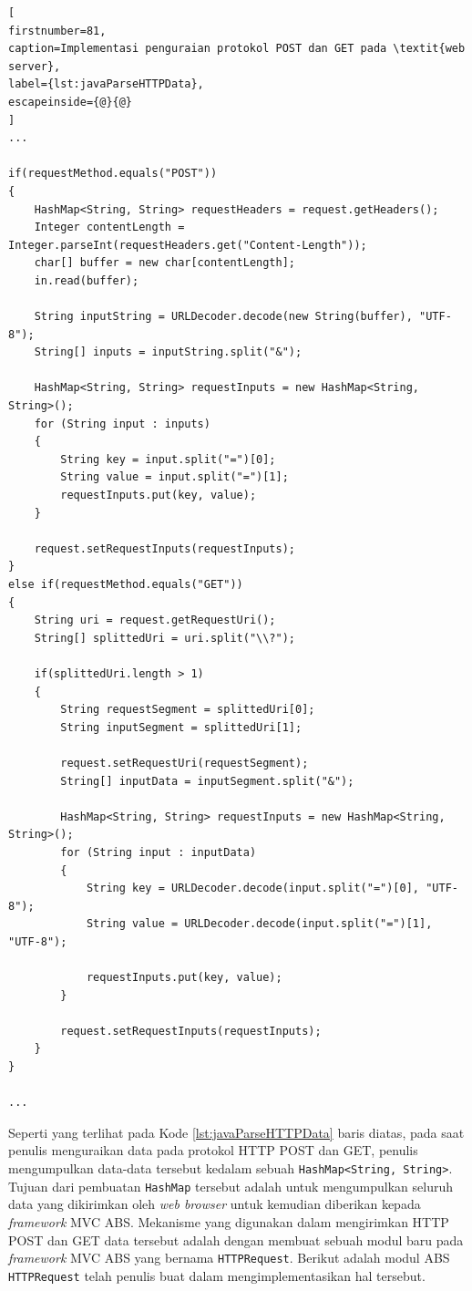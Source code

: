 \begin{lstlisting}[
firstnumber=81,
caption=Implementasi penguraian protokol POST dan GET pada \textit{web server},
label={lst:javaParseHTTPData},
escapeinside={@}{@}
]
...

if(requestMethod.equals("POST"))
{
   	HashMap<String, String> requestHeaders = request.getHeaders();
   	Integer contentLength = Integer.parseInt(requestHeaders.get("Content-Length"));
   	char[] buffer = new char[contentLength];
   	in.read(buffer);
   	
   	String inputString = URLDecoder.decode(new String(buffer), "UTF-8");
   	String[] inputs = inputString.split("&");
   	
   	HashMap<String, String> requestInputs = new HashMap<String, String>();
   	for (String input : inputs) 
   	{
		String key = input.split("=")[0];
		String value = input.split("=")[1];
		requestInputs.put(key, value);
	}
            	
    request.setRequestInputs(requestInputs);
}
else if(requestMethod.equals("GET"))
{
   	String uri = request.getRequestUri();
   	String[] splittedUri = uri.split("\\?");
   	
   	if(splittedUri.length > 1)
   	{
   		String requestSegment = splittedUri[0];
   		String inputSegment = splittedUri[1];
   		
   		request.setRequestUri(requestSegment);
   		String[] inputData = inputSegment.split("&");

   		HashMap<String, String> requestInputs = new HashMap<String, String>();
   		for (String input : inputData) 
   		{
   			String key = URLDecoder.decode(input.split("=")[0], "UTF-8");
   			String value = URLDecoder.decode(input.split("=")[1], "UTF-8");
   			
   			requestInputs.put(key, value);
		}
            		
   		request.setRequestInputs(requestInputs);
   	}
}

...
\end{lstlisting}

Seperti yang terlihat pada Kode \ref{lst:javaParseHTTPData} baris diatas, pada saat penulis menguraikan data pada protokol HTTP POST dan GET, penulis mengumpulkan data-data tersebut kedalam sebuah \texttt{HashMap<String, String>}. Tujuan dari pembuatan \texttt{HashMap} tersebut adalah untuk mengumpulkan seluruh data yang dikirimkan oleh \textit{web browser} untuk kemudian diberikan kepada \textit{framework} MVC ABS. Mekanisme yang digunakan dalam mengirimkan HTTP POST dan GET data tersebut adalah dengan membuat sebuah modul baru pada \textit{framework} MVC ABS yang bernama \texttt{HTTPRequest}. Berikut adalah modul ABS \texttt{HTTPRequest} telah penulis buat dalam mengimplementasikan hal tersebut.

